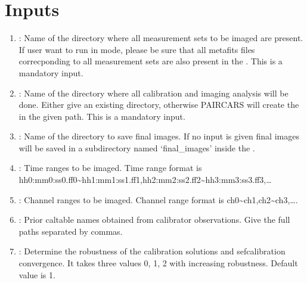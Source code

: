 \documentclass[letterpaper,10pt,english]{sphinxmanual}
\begin{document}
\section{Inputs}
\label{\detokenize{inputs:inputs}}\begin{enumerate}
%
\item {} 
\sphinxAtStartPar
{} : Name of the directory where all measurement sets to be imaged are present. If user want to run in  mode, please be sure that all metafits files correcponding to all measurement sets are also present in the . This is a mandatory input.

\item {} 
\sphinxAtStartPar
{} : Name of the directory where all calibration and imaging analysis will be done. Either give an existing directory, otherwise P\sphinxhyphen{}AIRCARS will create the  in the given path. This is a mandatory input.

\item {} 
\sphinxAtStartPar
{} : Name of the directory to save final images. If no input is given final images will be saved in a sub\sphinxhyphen{}directory named ‘final\_images’ inside the .

\item {} 
\sphinxAtStartPar
{} : Time ranges to be imaged. Time range format is hh0:mm0:ss0.ff0\textasciitilde{}hh1:mm1:ss1.ff1,hh2:mm2:ss2.ff2\textasciitilde{}hh3:mm3:ss3.ff3,…

\item {} 
\sphinxAtStartPar
{} : Channel ranges to be imaged. Channel range format is ch0\textasciitilde{}ch1,ch2\textasciitilde{}ch3,….

\item {} 
\sphinxAtStartPar
{} : Prior caltable names obtained from calibrator observations. Give the full paths separated by commas.

\item {} 
\sphinxAtStartPar
{} : Determine the robustness of the calibration solutions and sef\sphinxhyphen{}calibration convergence. It takes three values 0, 1, 2 with increasing robustness. Default value is 1.


\end{enumerate}
\end{document}
